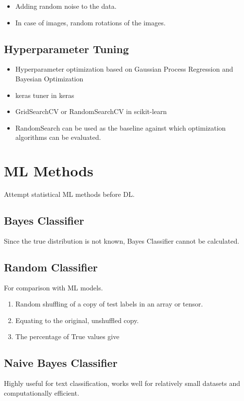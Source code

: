 \documentclass[a4paper, 12pt]{report}
\begin{document}
\begin{itemize}
\item Adding random noise to the data.
\item In case of images, random rotations of the images.
\end{itemize}

\section{Hyperparameter Tuning}
\begin{itemize}
\item Hyperparameter optimization based on Gaussian Process Regression and Bayesian Optimization
\item keras tuner in keras
\item GridSearchCV or RandomSearchCV in scikit-learn
\item RandomSearch can be used as the baseline against which optimization algorithms can be evaluated.
\end{itemize}

\chapter{ML Methods}
Attempt statistical ML methods before DL.

\section{Bayes Classifier}
Since the true distribution is not known, Bayes Classifier cannot be calculated.

\section{Random Classifier}
For comparison with ML models.
\begin{enumerate}
\item Random shuffling of a copy of test labels in an array or tensor.
\item Equating to the original, unshuffled copy.
\item The percentage of True values give
\end{enumerate}

\section{Naive Bayes Classifier}
Highly useful for text classification, works well for relatively small datasets and computationally efficient. 
\end{document}
